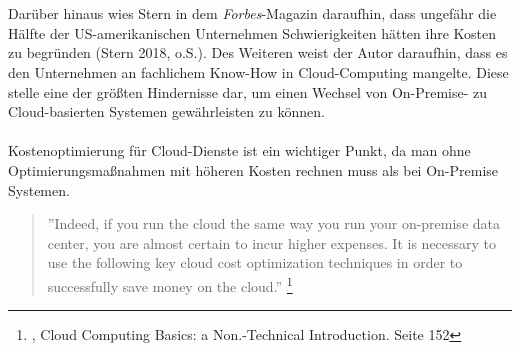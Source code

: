 \\\\
Darüber hinaus wies Stern in dem \textit{Forbes}-Magazin daraufhin, dass ungefähr die Hälfte der US-amerikanischen Unternehmen Schwierigkeiten hätten ihre Kosten zu begründen (Stern 2018, o.S.). Des Weiteren weist der Autor daraufhin, dass es den Unternehmen an fachlichem Know-How in Cloud-Computing mangelte. Diese stelle eine der größten Hindernisse dar, um einen Wechsel von On-Premise- zu Cloud-basierten Systemen gewährleisten zu können.
\\\\
Kostenoptimierung für Cloud-Dienste ist ein wichtiger Punkt, da man ohne Optimierungsmaßnahmen mit höheren Kosten rechnen muss als bei On-Premise Systemen.
\\
\begin{quote}
    ”Indeed, if you run the cloud the same way you run your on-premise data center, you are almost certain to incur higher expenses. It is necessary to use the following key cloud cost optimization techniques in order to successfully save money on the cloud.”
    \footnote{{\cite{CCB}}, Cloud Computing Basics: a Non.-Technical Introduction. Seite 152}
\end{quote}
\begin{comment} GELÖSCHT, WEIL DIESE EINE BEHAUPTUNG IST (25.10.2021)
    \\\\
    Für viele Unternehmen ist eine große Herausforderung, die Kosten von Cloud-Diensten übersichtlich zu halten und Optimierungsmöglichkeit leicht zu erkennen. Zusätzlich besteht die Gefahr, unangenehme Überraschungen in einer Rechnung zu bekommen, weil keine Grenze für den Konsum von Cloud-Diensten festgelegt wurde. 
    \end{comment}
